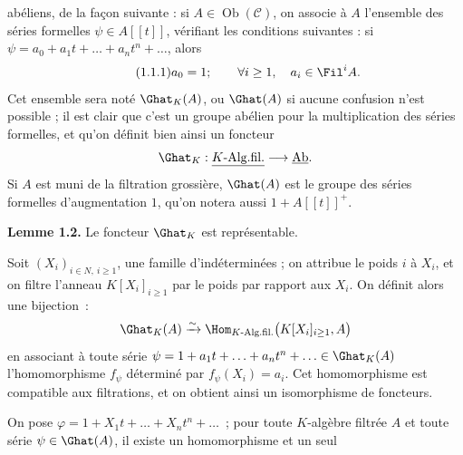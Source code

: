abéliens, de la
façon suivante : si \(A\in\operatorname{Ob}(\mathcal C)\), on associe à \(A\) l'ensemble des séries formelles \(\psi\in A[[t]]\), vérifiant les conditions suivantes : si \(\psi=a_0+a_1t+\ldots+a_nt^n+\ldots\), alors
\begin{equation}\tag{1.1.1}
  a_0=1;\qquad \forall i\geq 1,\quad a_i\in\Fil^i A .
\end{equation}
Cet ensemble sera noté \(\Ghat_K(A)\), ou \(\Ghat(A)\) si aucune confusion n'est possible ; il est clair que c'est un groupe abélien pour la multiplication des séries formelles, et qu'on définit bien ainsi un foncteur
\[
  \Ghat_K:\underline{K\text{-Alg.fil.}}\longrightarrow \underline{\mathrm{Ab}}.
\]
Si \(A\) est muni de la filtration grossière, \(\Ghat(A)\) est le groupe des séries formelles d'augmentation \(1\), qu'on notera aussi \(1+A[[t]]^+\).

\textbf{Lemme 1.2.} Le foncteur \(\Ghat_K\) est représentable.

Soit \((X_i)_{i\in N,\ i\geq 1}\), une famille d'indéterminées ; on attribue le poids \(i\) à \(X_i\), et on filtre l'anneau \(K[X_i]_{i\geq 1}\) par le poids par rapport aux \(X_i\). On définit alors une bijection~:
\[
  \Ghat_K(A)\xrightarrow{\sim}
  \Hom_{K\text{-Alg.fil.}}\bigl(K[X_i]_{i\geq 1},A\bigr)
\]
en associant à toute série \(\psi=1+a_1t+\ldots+a_nt^n+\ldots\in\Ghat_K(A)\) l'homomorphisme \(f_\psi\) déterminé par \(f_\psi(X_i)=a_i\). Cet homomorphisme est compatible aux filtrations, et on obtient ainsi un isomorphisme de foncteurs.

On pose \(\varphi=1+X_1t+\ldots+X_nt^n+\ldots\)~; pour toute \(K\)-algèbre filtrée \(A\) et toute série \(\psi\in\Ghat(A)\), il existe un homomorphisme et un
seul 
